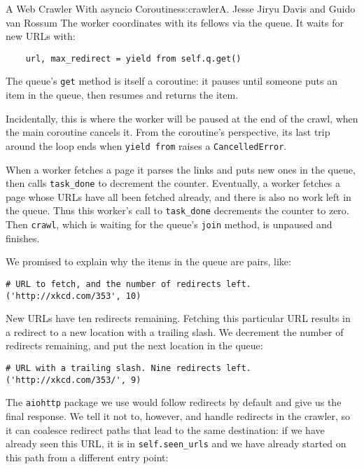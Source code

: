 \begin{aosachapter}{A Web Crawler With asyncio Coroutines}{s:crawler}{A. Jesse Jiryu Davis and Guido van Rossum}
The worker coordinates with its fellows via the queue. It waits for new
URLs with:

\begin{verbatim}
    url, max_redirect = yield from self.q.get()
\end{verbatim}

The queue's \texttt{get} method is itself a coroutine: it pauses until
someone puts an item in the queue, then resumes and returns the item.

Incidentally, this is where the worker will be paused at the end of the
crawl, when the main coroutine cancels it. From the coroutine's
perspective, its last trip around the loop ends when \texttt{yield from}
raises a \texttt{CancelledError}.

When a worker fetches a page it parses the links and puts new ones in
the queue, then calls \texttt{task\_done} to decrement the counter.
Eventually, a worker fetches a page whose URLs have all been fetched
already, and there is also no work left in the queue. Thus this worker's
call to \texttt{task\_done} decrements the counter to zero. Then
\texttt{crawl}, which is waiting for the queue's \texttt{join} method,
is unpaused and finishes.

We promised to explain why the items in the queue are pairs, like:

\begin{verbatim}
# URL to fetch, and the number of redirects left.
('http://xkcd.com/353', 10)
\end{verbatim}

New URLs have ten redirects remaining. Fetching this particular URL
results in a redirect to a new location with a trailing slash. We
decrement the number of redirects remaining, and put the next location
in the queue:

\begin{verbatim}
# URL with a trailing slash. Nine redirects left.
('http://xkcd.com/353/', 9)
\end{verbatim}

The \texttt{aiohttp} package we use would follow redirects by default
and give us the final response. We tell it not to, however, and handle
redirects in the crawler, so it can coalesce redirect paths that lead to
the same destination: if we have already seen this URL, it is in
\texttt{self.seen\_urls} and we have already started on this path from a
different entry point:



\end{aosachapter}
